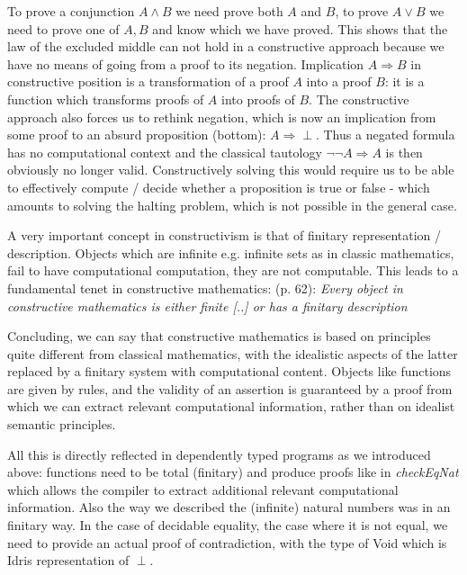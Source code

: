To prove a conjunction $A \land B$ we need prove both $A$ and $B$, to prove $A \lor B$ we need to prove one of $A, B$ and know which we have proved. This shows that the law of the excluded middle can not hold in a constructive approach because we have no means of going from a proof to its negation. Implication $A \Rightarrow B$ in constructive position is a transformation of a proof $A$ into a proof $B$: it is a function which transforms proofs of $A$ into proofs of $B$. The constructive approach also forces us to rethink negation, which is now an implication from some proof to an absurd proposition (bottom): $A \Rightarrow \perp$. Thus a negated formula has no computational context and the classical tautology $\neg \neg A \Rightarrow A$ is then obviously no longer valid.  Constructively solving this would require us to be able to effectively compute / decide whether a proposition is true or false - which amounts to solving the halting problem, which is not possible in the general case.

A very important concept in constructivism is that of finitary representation / description. Objects which are infinite e.g. infinite sets as in classic mathematics, fail to have computational computation, they are not computable. This leads to a fundamental tenet in constructive mathematics: \cite{thompson_type_1991} (p. 62): \textit{Every object in constructive mathematics is either finite [..] or has a finitary description}


Concluding, we can say that constructive mathematics is based on principles quite different from classical mathematics, with the idealistic aspects of the latter replaced by a finitary system with computational content. Objects like functions are given by rules, and the validity of an assertion is guaranteed by a proof from which we can extract relevant computational information, rather than on idealist semantic principles. 

All this is directly reflected in dependently typed programs as we introduced above: functions need to be total (finitary) and produce proofs like in \textit{checkEqNat} which allows the compiler to extract additional relevant computational information. Also the way we described the (infinite) natural numbers was in an finitary way. In the case of decidable equality, the case where it is not equal, we need to provide an actual proof of contradiction, with the type of Void which is Idris representation of $\perp$. 